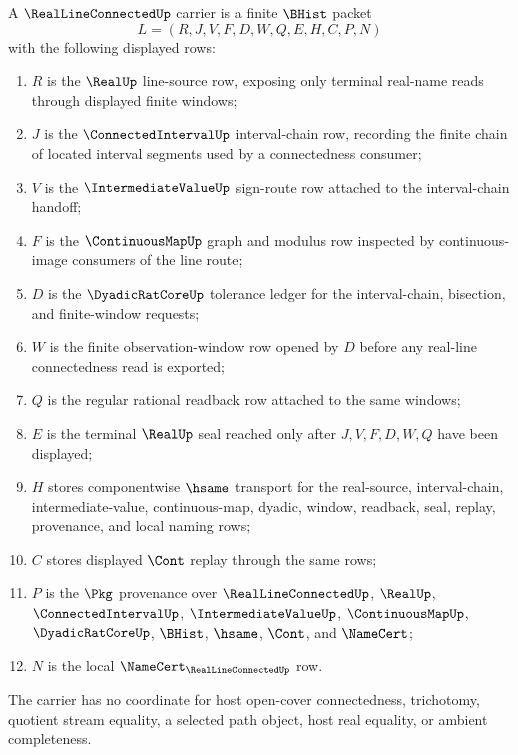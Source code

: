 \begin{definition}
\label{def:real-line-connected-carrier}
A $\RealLineConnectedUp$ carrier is a finite $\BHist$ packet
$$
L=(R,J,V,F,D,W,Q,E,H,C,P,N)
$$
with the following displayed rows:
\begin{enumerate}
\item $R$ is the $\RealUp$ line-source row, exposing only terminal real-name reads through displayed finite windows;
\item $J$ is the $\ConnectedIntervalUp$ interval-chain row, recording the finite chain of located interval segments used by a connectedness consumer;
\item $V$ is the $\IntermediateValueUp$ sign-route row attached to the interval-chain handoff;
\item $F$ is the $\ContinuousMapUp$ graph and modulus row inspected by continuous-image consumers of the line route;
\item $D$ is the $\DyadicRatCoreUp$ tolerance ledger for the interval-chain, bisection, and finite-window requests;
\item $W$ is the finite observation-window row opened by $D$ before any real-line connectedness read is exported;
\item $Q$ is the regular rational readback row attached to the same windows;
\item $E$ is the terminal $\RealUp$ seal reached only after $J,V,F,D,W,Q$ have been displayed;
\item $H$ stores componentwise $\hsame$ transport for the real-source, interval-chain, intermediate-value, continuous-map, dyadic, window, readback, seal, replay, provenance, and local naming rows;
\item $C$ stores displayed $\Cont$ replay through the same rows;
\item $P$ is the $\Pkg$ provenance over $\RealLineConnectedUp$, $\RealUp$, $\ConnectedIntervalUp$, $\IntermediateValueUp$, $\ContinuousMapUp$, $\DyadicRatCoreUp$, $\BHist$, $\hsame$, $\Cont$, and $\NameCert$;
\item $N$ is the local $\NameCert_{\RealLineConnectedUp}$ row.
\end{enumerate}
The carrier has no coordinate for host open-cover connectedness, trichotomy, quotient stream equality, a selected path object, host real equality, or ambient completeness.
\end{definition}


